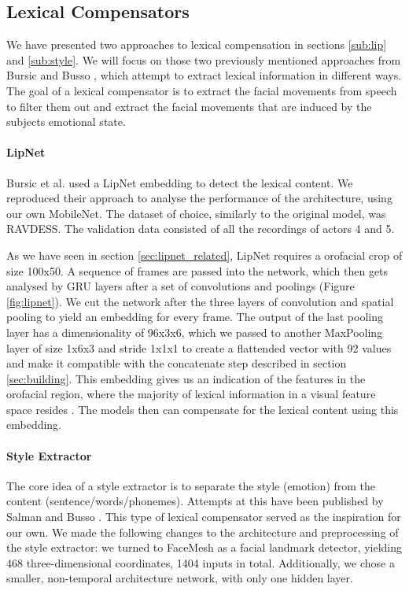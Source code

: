 \subsection{Lexical Compensators}
\label{sub:lex}
We have presented two approaches to lexical compensation in sections \ref{sub:lip} and \ref{sub:style}. We will focus on those two previously mentioned approaches from Bursic \cite{bursic2020improving} and Busso \cite{salman2020style}, which attempt to extract lexical information in different ways. The goal of a lexical compensator is to extract the facial movements from speech to filter them out and extract the facial movements that are induced by the subjects emotional state.

\paragraph{LipNet} 
Bursic et al. \cite{bursic2020improving} used a LipNet embedding to detect the lexical content. We reproduced their approach to analyse the performance of the architecture, using our own MobileNet. The dataset of choice, similarly to the original model, was RAVDESS. The validation data consisted of all the recordings of actors 4 and 5.

As we have seen in section \ref{sec:lipnet_related}, LipNet requires a orofacial crop of size 100x50. A sequence of frames are passed into the network, which then gets analysed by GRU layers after a set of convolutions and poolings (Figure \ref{fig:lipnet}). We cut the network after the three layers of convolution and spatial pooling to yield an embedding for every frame. The output of the last pooling layer has a dimensionality of 96x3x6, which we passed to another MaxPooling layer of size 1x6x3 and stride 1x1x1 to create a flattended vector with 92 values and make it compatible with the concatenate step described in section \ref{sec:building}. This embedding gives us an indication of the features in the orofacial region, where the majority of lexical information in a visual feature space resides \cite{mariooryad2012factorizing}. The models then can compensate for the lexical content using this embedding.

\paragraph{Style Extractor}
The core idea of a style extractor is to separate the style (emotion) from the content (sentence/words/phonemes). Attempts at this have been published by Salman and Busso \cite{salman2020style}. This type of lexical compensator served as the inspiration for our own. We made the following changes to the architecture and preprocessing of the style extractor: we turned to FaceMesh as a facial landmark detector, yielding 468 three-dimensional coordinates, 1404 inputs in total. Additionally, we chose a smaller, non-temporal architecture network, with only one hidden layer.

